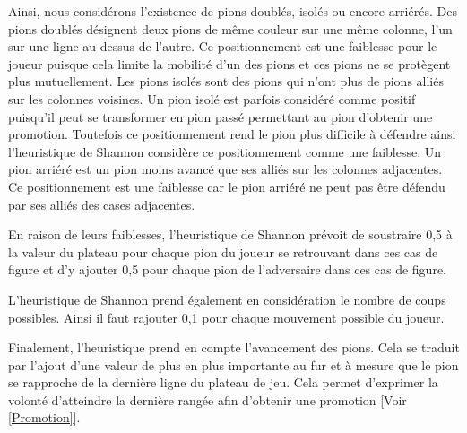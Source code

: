 \documentclass{article}
\begin{document}
Ainsi, nous considérons l'existence de pions doublés, isolés ou encore arriérés.
\newline
Des pions doublés désignent deux pions de même couleur sur une même colonne, l'un sur une ligne au dessus de l'autre. Ce positionnement est une faiblesse pour le joueur puisque cela limite la mobilité d'un des pions et ces pions ne se protègent plus mutuellement.
\newline
Les pions isolés sont des pions qui n'ont plus de pions alliés sur les colonnes voisines. Un pion isolé est parfois considéré comme positif puisqu'il peut se transformer en pion passé permettant au pion d'obtenir une promotion. Toutefois ce positionnement rend le pion plus difficile à défendre ainsi l'heuristique de Shannon considère ce positionnement comme une faiblesse.
\newline
Un pion arriéré est un pion moins avancé que ses alliés sur les colonnes adjacentes. Ce positionnement est une faiblesse car le pion arriéré ne peut pas être défendu par ses alliés des cases adjacentes.

En raison de leurs faiblesses, l'heuristique de Shannon prévoit de soustraire 0,5 à la valeur du plateau pour chaque pion du joueur se retrouvant dans ces cas de figure et d'y ajouter 0,5 pour chaque pion de l'adversaire dans ces cas de figure.
\newline

L'heuristique de Shannon prend également en considération le nombre de coups possibles. Ainsi il faut rajouter 0,1 pour chaque mouvement possible du joueur.
\newline

Finalement, l'heuristique prend en compte l'avancement des pions. Cela se traduit par l'ajout d'une valeur de plus en plus importante au fur et à mesure que le pion se rapproche de la dernière ligne du plateau de jeu. Cela permet d'exprimer la volonté d'atteindre la dernière rangée afin d'obtenir une promotion [Voir \ref{Promotion}].
\end{document}
